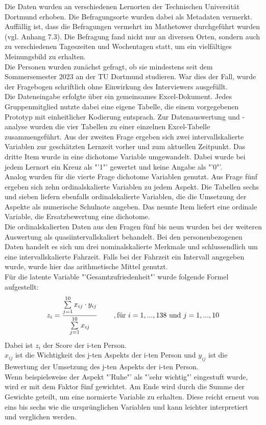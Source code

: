\documentclass[11pt, a4paper]{article}
\begin{document}
\vspace{-0.15cm}
Die Daten wurden an verschiedenen Lernorten der Technischen Universität Dortmund erhoben. Die Befragungsorte wurden dabei als Metadaten vermerkt. Auffällig ist, dass die Befragungen vermehrt im Mathetower durchgeführt wurden (vgl. Anhang 7.3). Die Befragung fand nicht nur an diversen Orten, sondern auch zu verschiedenen Tageszeiten und Wochentagen statt, um ein vielfältiges Meinungsbild zu erhalten.\\
Die Personen wurden zunächst gefragt, ob sie mindestens seit dem Sommersemester 2023 an der TU Dortmund studieren. War dies der Fall, wurde der Fragebogen schriftlich ohne Einwirkung des Interviewers ausgefüllt.\\
Die Dateneingabe erfolgte über ein gemeinsames Excel-Dokument. Jedes Gruppenmitglied nutzte dabei eine eigene Tabelle, die einem vorgegebenen Prototyp mit einheitlicher Kodierung entsprach. Zur Datenauswertung und -analyse wurden die vier Tabellen zu einer einzelnen Excel-Tabelle zusammengeführt. Aus der zweiten Frage ergeben sich zwei intervallskalierte Variablen zur geschätzten Lernzeit vorher und zum aktuellen Zeitpunkt. Das dritte Item wurde in eine dichotome Variable umgewandelt. Dabei wurde bei jedem Lernort ein Kreuz als "'1"' gewertet und keine Angabe als "'0"'. \\
Analog wurden für die vierte Frage dichotome Variablen genutzt. Aus Frage fünf ergeben sich zehn ordinalskalierte Variablen zu jedem Aspekt. Die Tabellen sechs und sieben liefern ebenfalls ordinalskalierte Variablen, die die Umsetzung der Aspekte als numerische Schulnote angeben. Das neunte Item liefert eine ordinale Variable, die Ersatzbewertung eine dichotome.\\
Die ordinalskalierten Daten aus den Fragen fünf bis neun wurden bei der weiteren Auswertung als quasiintervallskaliert behandelt. Bei den personenbezogenen Daten handelt es sich um drei nominalskalierte Merkmale und schlussendlich um eine intervallskalierte Fahrzeit. Falls bei der Fahrzeit ein Intervall angegeben wurde, wurde hier das arithmetische Mittel genutzt. \\

\vspace{-0.1cm}
Für die latente Variable "'Gesamtzufriedenheit"' wurde folgende Formel aufgestellt:
\begin{equation*}
	z_i = \frac{\sum\limits_{j=1}^{10}x_{ij}\cdot  y_{ij}}{\sum\limits_{j=1}^{10}x_{ij}} \hspace{0.8cm} , \text{für} \ 
	i=1,...,138\  \text{und} \ j=1,...,10
	\vspace{0.15cm}
\end{equation*} 
Dabei ist $z_i$ der Score der i-ten Person. \\
$x_{ij}$ ist die Wichtigkeit des j-ten Aspekts der i-ten Person und
$y_{ij}$ ist die Bewertung der Umsetzung des j-ten Aspekts der i-ten Person.\\
 Wenn beispielsweise der Aspekt "'Ruhe"' als "'sehr wichtig"' eingestuft wurde, wird er mit dem Faktor fünf gewichtet. Am Ende wird durch die Summe der Gewichte geteilt, um eine normierte Variable zu erhalten.  Diese reicht erneut von eins bis sechs wie die ursprünglichen Variablen und kann leichter interpretiert und verglichen werden.\\
\end{document}
